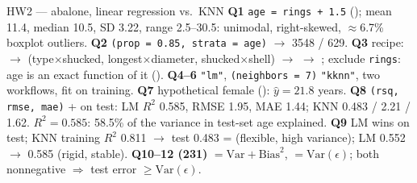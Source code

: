 \begin{topic}{HW2 --- abalone, linear regression vs.\ KNN }
\textbf{Q1} \texttt{age = rings + 1.5} (); mean 11.4, median 10.5, SD 3.22, range 2.5--30.5: unimodal, right-skewed,
$\approx$6.7\% boxplot outliers. \textbf{Q2}  \texttt{(prop = 0.85, strata = age)} $\to$ 3548 / 629.
\textbf{Q3} recipe:  $\to$  (type$\times$shucked, longest$\times$diameter,
shucked$\times$shell) $\to$  $\to$ ; exclude \texttt{rings}: age is an exact
function of it (). \textbf{Q4--6}  \texttt{"lm"},  \texttt{(neighbors = 7)}
\texttt{"kknn"}, two workflows, fit on training. \textbf{Q7} hypothetical female (): $\hat y=21.8$ years.
\textbf{Q8} \texttt{(rsq, rmse, mae)} +  on test: LM $R^2$ 0.585, RMSE 1.95, MAE 1.44; KNN 0.483 / 2.21 / 1.62. $R^2=0.585$: 58.5\% of the variance
in test-set age explained. \textbf{Q9} LM wins on test; KNN training $R^2$ 0.811 $\to$ test 0.483 = 
(flexible, high variance); LM 0.552 $\to$ 0.585 (rigid, stable). \textbf{Q10--12 (231)}  $=\mathrm{Var}+\mathrm{Bias}^2$,
 $=\mathrm{Var}(\epsilon)$; both nonnegative $\Rightarrow$ test error $\ge \mathrm{Var}(\epsilon)$.
\end{topic}

